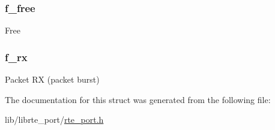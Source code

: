 \subsubsection[{f\+\_\+free}]{ f\+\_\+free}\label{structrte__port__in__ops_a06fe0cfe57dda6c925889719283fdec4}
Free \hypertarget{structrte__port__in__ops_a33a5d93578273b6bc577f89c86643c55}{}
\subsubsection[{f\+\_\+rx}]{ f\+\_\+rx}\label{structrte__port__in__ops_a33a5d93578273b6bc577f89c86643c55}
Packet R\+X (packet burst) 

The documentation for this struct was generated from the following file\+:\begin{DoxyCompactItemize}
\item 
lib/librte\+\_\+port/\hyperlink{rte__port_8h}{rte\+\_\+port.\+h}\end{DoxyCompactItemize}
